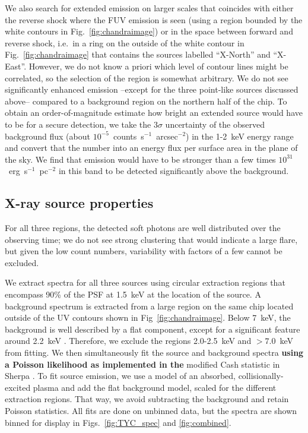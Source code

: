 \documentclass[linenumbers]{aastex631}
\begin{document}
We also search for extended emission on larger scales that coincides with either the reverse shock where the FUV emission is seen (using a region bounded by the white contours  in Fig.~\ref{fig:chandraimage}) or in the space between forward and reverse shock, i.e.\ in a ring on the outside of the white contour in Fig.~\ref{fig:chandraimage} that contains the sources labelled ``X-North'' and ``X-East''. However, we do not know a priori which level of contour lines might be correlated, so the selection of the region is somewhat arbitrary. We do not see significantly enhanced emission --except for the three point-like sources discussed above-- compared to a background region on the northern half of the chip. To obtain an order-of-magnitude estimate how bright an extended source would have to be for a secure detection, we take the $3\sigma$ uncertainty of the observed background flux (about $10^{-5}$~counts~s$^{-1}$~arcsec$^{-2}$) in the 1-2~keV energy range and convert that the number into an energy flux per surface area in the plane of the sky. We find that emission would have to be stronger than a few times $10^{31}$~erg~s$^{-1}$~pc$^{-2}$ in this band to be detected significantly above the background.

\subsection{X-ray source properties}
\label{sec:xrayspectra}
For all three regions, the detected soft photons are well distributed over the observing time; we do not see strong clustering that would indicate a large flare, but given the low count numbers, variability with factors of a few cannot be excluded.

We extract spectra for all three sources using circular extraction regions that encompass 90\% of the PSF at 1.5~keV at the location of the source. A background spectrum is extracted from a large region on the same chip located outside of the UV contours shown in Fig~\ref{fig:chandraimage}. Below 7~keV, the background is well described by a flat component, except for a significant feature around 2.2~keV \citep[caused by fluorescence of gold in the instrument,][]{2021arXiv210811234S}. Therefore, we exclude the regions 2.0-2.5~keV and $>7.0$~keV from fitting. We then simultaneously fit the source and background spectra \textbf{using a Poisson likelihood as implemented in the} modified Cash statistic \citep{1979ApJ...228..939C} in Sherpa \citep{2007ASPC..376..543D,doug_burke_2021_4428938}. To fit source emission, we use a model of an absorbed, collisionally-excited plasma \citep[APEC model,][]{2012ApJ...756..128F} and add the flat background model, scaled for the different extraction regions. That way, we avoid subtracting the background and retain Poisson statistics. All fits are done on unbinned data, but the spectra are shown binned for display in Figs.~\ref{fig:TYC_spec} and \ref{fig:combined}.
\end{document}
